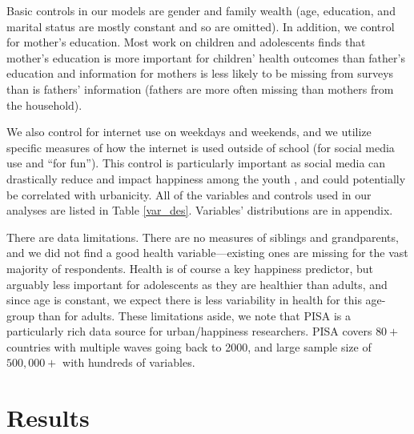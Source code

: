 \documentclass[10pt, letterpaper]{article}
\begin{document}
\begin{spacing}{1.4}
Basic controls in our models are gender and family wealth (age, education, and
marital status are mostly constant and so are omitted). In addition, we control
for mother's education. Most work on children and adolescents finds that
mother's education is more important for children' health outcomes than father's
education \citep{nepal2018matters} and information for mothers is less likely to
be missing from surveys than is fathers' information (fathers are more often
missing than mothers from the household). 

We also control for internet use on weekdays and weekends, and we utilize  specific measures of how the
internet is used outside of school (for  social media use and ``for fun''). This control is particularly important as  social media can
drastically reduce and impact happiness among the youth
\citep{twengeATL17sep,twenge14}, and could potentially be correlated with
urbanicity. All of the variables and controls used in our analyses are listed
in Table \ref{var_des}. Variables' distributions are in appendix.

There are data limitations. There are no measures of siblings
and grandparents, and we did not find a good health variable---existing ones are
missing for the vast majority of respondents. Health is of course a key
happiness predictor, but arguably less important for adolescents as they are
healthier than adults, and since age is constant, we expect there is less variability in
health for this age-group than for adults. These limitations aside, we  note
that PISA is a particularly rich data source  for urban/happiness researchers. PISA covers $80+$ countries with multiple waves going back to 2000, and large sample size of $500,000+$ with hundreds of variables. %
 
 

\section*{Results}


\end{spacing}
\end{document}
